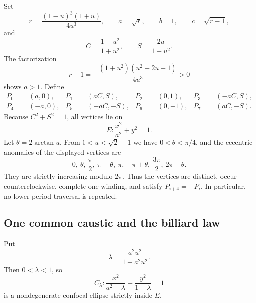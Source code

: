 \documentclass[11pt,a4paper]{amsart}
\theoremstyle{definition}
\theoremstyle{remark}
\begin{document}
Set
\begin{equation}\label{eq:parameters}
 r=\frac{(1-u)^3(1+u)}{4u^3},\qquad
 a=\sqrt r,\qquad b=1,\qquad c=\sqrt{r-1},
\end{equation}
and
\begin{equation}\label{eq:CS}
 C=\frac{1-u^2}{1+u^2},\qquad
 S=\frac{2u}{1+u^2}.
\end{equation}
The factorization
\begin{equation}\label{eq:rminusone}
 r-1=-\frac{(1+u^2)(u^2+2u-1)}{4u^3}>0
\end{equation}
shows $a>1$.  Define
\begin{equation}\label{eq:vertices}
\begin{aligned}
P_0&=(a,0),&P_1&=(aC,S),&P_2&=(0,1),&P_3&=(-aC,S),\\
P_4&=(-a,0),&P_5&=(-aC,-S),&P_6&=(0,-1),&P_7&=(aC,-S).
\end{aligned}
\end{equation}
Because $C^2+S^2=1$, all vertices lie on
\begin{equation}\label{eq:outer}
 E:\frac{x^2}{a^2}+y^2=1.
\end{equation}
Let $\theta=2\arctan u$.  From $0<u<\sqrt2-1$ we have
$0<\theta<\pi/4$, and the eccentric anomalies of the displayed vertices are
\[
 0,\ \theta,\ \frac\pi2,\ \pi-\theta,\ \pi,\quad
 \pi+\theta,\ \frac{3\pi}2,\ 2\pi-\theta.
\]
They are strictly increasing modulo $2\pi$.  Thus the vertices are distinct,
occur counterclockwise, complete one winding, and satisfy $P_{i+4}=-P_i$.
In particular, no lower-period traversal is repeated.

\subsection*{One common caustic and the billiard law}

Put
\begin{equation}\label{eq:lambda}
 \lambda=\frac{a^2u^2}{1+a^2u^2}.
\end{equation}
Then $0<\lambda<1$, so
\begin{equation}\label{eq:caustic}
 C_\lambda:\frac{x^2}{a^2-\lambda}
             +\frac{y^2}{1-\lambda}=1
\end{equation}
is a nondegenerate confocal ellipse strictly inside $E$.
\end{document}

